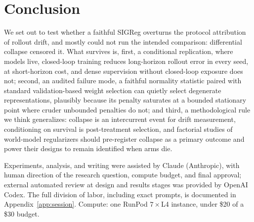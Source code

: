 \documentclass{article}
\begin{document}
\section{Conclusion}
\label{sec:conclusion}

We set out to test whether a faithful SIGReg overturns the protocol attribution of rollout drift, and mostly could not run the intended comparison: differential collapse censored it. What survives is, first, a conditional replication, where models live, closed-loop training reduces long-horizon rollout error in every seed, at short-horizon cost, and dense supervision without closed-loop exposure does not; second, an audited failure mode, a faithful normality statistic paired with standard validation-based weight selection can quietly select degenerate representations, plausibly because its penalty saturates at a bounded stationary point where cruder unbounded penalties do not; and third, a methodological rule we think generalizes: collapse is an intercurrent event for drift measurement, conditioning on survival is post-treatment selection, and factorial studies of world-model regularizers should pre-register collapse as a primary outcome and power their designs to remain identified when arms die.

\begin{ack}
Experiments, analysis, and writing were assisted by Claude (Anthropic), with human direction of the research question, compute budget, and final approval; external automated review at design and results stages was provided by OpenAI Codex. The full division of labor, including exact prompts, is documented in Appendix~\ref{app:session}. Compute: one RunPod $7{\times}$L4 instance, under \$20 of a \$30 budget.
\end{ack}




\newpage
\appendix



\newpage

\end{document}
